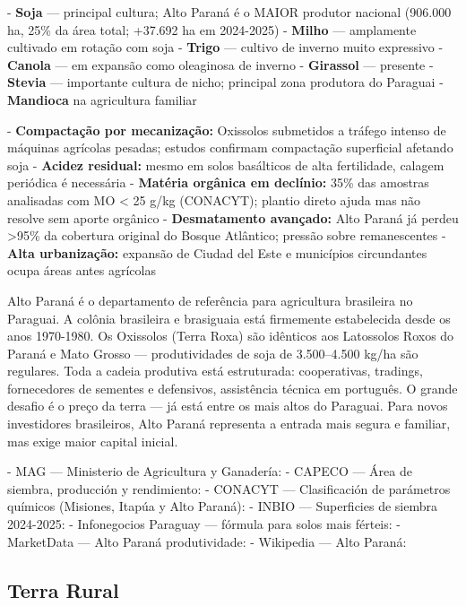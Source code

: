 - \textbf{Soja} --- principal cultura; Alto Paraná é o MAIOR produtor nacional (906.000 ha, 25\% da área total; +37.692 ha em 2024-2025)
- \textbf{Milho} --- amplamente cultivado em rotação com soja
- \textbf{Trigo} --- cultivo de inverno muito expressivo
- \textbf{Canola} --- em expansão como oleaginosa de inverno
- \textbf{Girassol} --- presente
- \textbf{Stevia} --- importante cultura de nicho; principal zona produtora do Paraguai
- \textbf{Mandioca} na agricultura familiar


- \textbf{Compactação por mecanização:} Oxissolos submetidos a tráfego intenso de máquinas agrícolas pesadas; estudos confirmam compactação superficial afetando soja
- \textbf{Acidez residual:} mesmo em solos basálticos de alta fertilidade, calagem periódica é necessária
- \textbf{Matéria orgânica em declínio:} 35\% das amostras analisadas com MO < 25 g/kg (CONACYT); plantio direto ajuda mas não resolve sem aporte orgânico
- \textbf{Desmatamento avançado:} Alto Paraná já perdeu >95\% da cobertura original do Bosque Atlântico; pressão sobre remanescentes
- \textbf{Alta urbanização:} expansão de Ciudad del Este e municípios circundantes ocupa áreas antes agrícolas


Alto Paraná é o departamento de referência para agricultura brasileira no Paraguai. A colônia brasileira e brasiguaia está firmemente estabelecida desde os anos 1970-1980. Os Oxissolos (Terra Roxa) são idênticos aos Latossolos Roxos do Paraná e Mato Grosso --- produtividades de soja de 3.500--4.500 kg/ha são regulares. Toda a cadeia produtiva está estruturada: cooperativas, tradings, fornecedores de sementes e defensivos, assistência técnica em português. O grande desafio é o preço da terra --- já está entre os mais altos do Paraguai. Para novos investidores brasileiros, Alto Paraná representa a entrada mais segura e familiar, mas exige maior capital inicial.


- MAG --- Ministerio de Agricultura y Ganadería: 
- CAPECO --- Área de siembra, producción y rendimiento: 
- CONACYT --- Clasificación de parámetros químicos (Misiones, Itapúa y Alto Paraná): 
- INBIO --- Superficies de siembra 2024-2025: 
- Infonegocios Paraguay --- fórmula para solos mais férteis: 
- MarketData --- Alto Paraná produtividade: 
- Wikipedia --- Alto Paraná: 


\subsection{Terra Rural}



